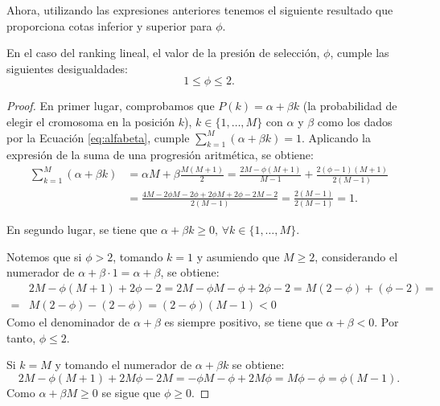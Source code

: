 Ahora, utilizando las expresiones anteriores tenemos el siguiente resultado que proporciona cotas inferior y superior para $\phi$.
\begin{proposition}
    En el caso del ranking lineal, el valor de la presión de selección, $\phi$, cumple las siguientes desigualdades:
    $$1\leq\phi\leq2.$$
    \begin{proof}
        En primer lugar, comprobamos que $P(k)=\alpha+\beta k$ (la probabilidad de elegir el cromosoma en la posición $k$), $k\in\{1,\ldots,M\}$ con $\alpha$ y $\beta$ como los dados por la Ecuación \ref{eq:alfabeta}, cumple $\sum_{k=1}^M(\alpha+\beta k)=1$. Aplicando la expresión de la suma de una progresión aritmética, se obtiene:        
        \begin{equation*}
            \begin{split}
                \sum_{k=1}^M(\alpha+\beta k)&=\alpha M+\beta\frac{M(M+1)}{2}=\frac{2M-\phi(M+1)}{M-1}+\frac{2(\phi-1)(M+1)}{2(M-1)}\\
                &=\frac{4M-2\phi M-2\phi+2\phi M+2\phi-2M-2}{2(M-1)}=\frac{2(M-1)}{2(M-1)}=1.
            \end{split}
        \end{equation*}

        En segundo lugar, se tiene que $\alpha+\beta k \geq 0,\,\forall k\in\{1,\ldots,M\}$.
        
        \noindent\textbullet\hspace{0.4cm}Notemos que si $\phi>2$, tomando $k=1$ y asumiendo que $M\geq2$, considerando el numerador de $\alpha+\beta\cdot 1=\alpha+\beta$, se obtiene:
        \begin{equation*}
            \begin{split}
                &2M-\phi(M+1)+2\phi -2=2M-\phi M-\phi+2\phi-2=M(2-\phi)+( \phi-2)=\\
                =&M(2-\phi)-(2-\phi)=(2-\phi)(M-1)<0
            \end{split}            
        \end{equation*}
        Como el denominador de $\alpha+\beta$ es siempre positivo, se tiene que $\alpha+\beta<0$. Por tanto, $\phi\leq2$.
         
        \noindent\textbullet\hspace{0.4cm} Si $k=M$ y tomando el numerador de $\alpha+\beta k$ se obtiene:
        $$2M-\phi(M+1)+2M\phi-2M=-\phi M-\phi+2M\phi=M\phi-\phi=\phi(M-1).$$
        Como $\alpha+\beta M\geq0$ se sigue que $\phi\geq0$.


\end{proof}
\end{proposition}
